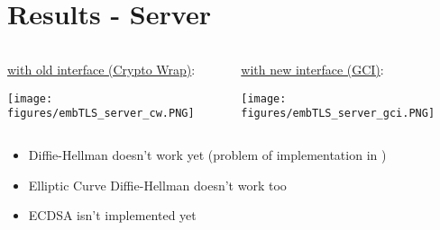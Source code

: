 \section{Results - \embtls Server}

\begin{frame}

\begin{columns}

\begin{column}{0.5\textwidth}

\underline{with old interface (Crypto Wrap)}:

\texttt{[image: figures/embTLS\_server\_cw.PNG]}

\end{column}

\begin{column}{0.5\textwidth}

\underline{with new interface (GCI)}:

\texttt{[image: figures/embTLS\_server\_gci.PNG]}

\end{column}

\end{columns}

\begin{itemize}
  \item Diffie-Hellman doesn't work yet (problem of implementation in \embtls)
  \item Elliptic Curve Diffie-Hellman doesn't work too
  \item ECDSA isn't implemented yet
\end{itemize}

\end{frame}
